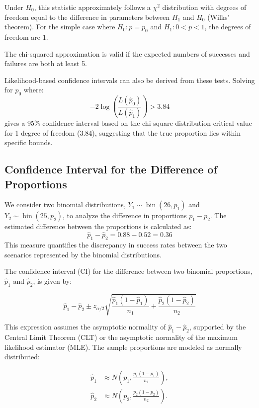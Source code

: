 \documentclass{article}
\begin{document}
Under $H_0$, this statistic approximately follows a $\chi^2$ distribution with degrees of freedom equal to the difference in parameters between $H_1$ and $H_0$ (Wilks' theorem). For the simple case where $H_0: p = p_0$ and $H_1: 0 < p < 1$, the degrees of freedom are 1.

The chi-squared approximation is valid if the expected numbers of successes and failures are both at least 5.

Likelihood-based confidence intervals can also be derived from these tests. Solving for $p_0$ where:
\[
-2 \log \left(\frac{L(\hat{p}_{0})}{L(\hat{p}_{1})}\right) > 3.84
\]
gives a 95\% confidence interval based on the chi-square distribution critical value for 1 degree of freedom (3.84), suggesting that the true proportion lies within specific bounds.

\subsection{Confidence Interval for the Difference of Proportions}

We consider two binomial distributions, \( Y_{1} \sim \operatorname{bin}(26, p_{1}) \) and \( Y_{2} \sim \operatorname{bin}(25, p_{2}) \), to analyze the difference in proportions \( p_{1} - p_{2} \). The estimated difference between the proportions is calculated as:
\[
\hat{p}_{1} - \hat{p}_{2} = 0.88 - 0.52 = 0.36
\]
This measure quantifies the discrepancy in success rates between the two scenarios represented by the binomial distributions.

The confidence interval (CI) for the difference between two binomial proportions, $\hat{p}_{1}$ and $\hat{p}_{2}$, is given by:

\[
\hat{p}_{1} - \hat{p}_{2} \pm z_{\alpha / 2} \sqrt{\frac{\hat{p}_{1}(1-\hat{p}_{1})}{n_{1}} + \frac{\hat{p}_{2}(1-\hat{p}_{2})}{n_{2}}}
\]

This expression assumes the asymptotic normality of $\hat{p}_{1} - \hat{p}_{2}$, supported by the Central Limit Theorem (CLT) or the asymptotic normality of the maximum likelihood estimator (MLE). The sample proportions are modeled as normally distributed:

\[
\begin{aligned}
\hat{p}_{1} &\approx N\left(p_{1}, \frac{p_{1}(1-p_{1})}{n_{1}}\right), \\
\hat{p}_{2} &\approx N\left(p_{2}, \frac{p_{2}(1-p_{2})}{n_{2}}\right).
\end{aligned}
\]
\end{document}
